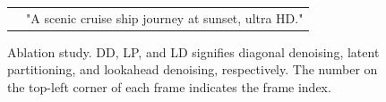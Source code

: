 \begin{figure}[t]
{\begin{tabular}{cccccc}
        & \multicolumn{5}{c}{\textsf{"A scenic cruise ship journey at sunset, ultra HD."}} \vspace{1mm} \\
    \end{tabular}
    }
    \caption{
        Ablation study.
        DD, LP, and LD signifies diagonal denoising, latent partitioning, and lookahead denoising, respectively.
        The number on the top-left corner of each frame indicates the frame index.
    }\label{fig:ablation}
\end{figure}

\begin{table}[t]
    \caption{
        Relative MSE losses of ablations.
        `LP' and `LD' denote latent partitioning and lookahead denosing, respectively.
        }
    \label{tab:ablation}
    \vspace{2mm}
    \setlength{\tabcolsep}{5mm}
    \centering
\end{table}
